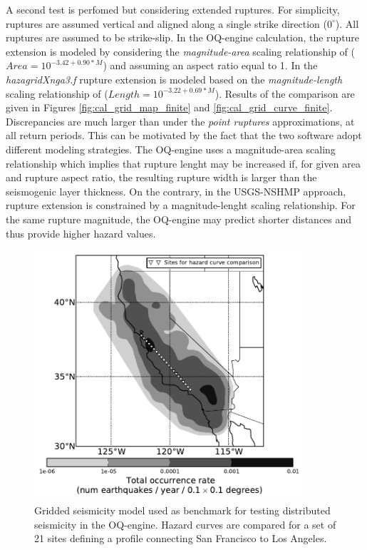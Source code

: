 A second test is perfomed but considering extended ruptures. For simplicity, ruptures are assumed vertical and aligned along a single strike direction ($0^{\circ}$). All ruptures are assumed to be strike-slip. In the OQ-engine calculation, the rupture extension is modeled by considering the \textit{magnitude-area} scaling relationship of \cite{wells1994} ($Area = 10^{-3.42 + 0.90 * M}$) and assuming an aspect ratio equal to 1. In the \textit{hazagridXnga3.f} rupture extension is modeled based on the \textit{magnitude-length} scaling relationship of \cite{wells1994} ($Length = 10^{-3.22+0.69 * M}$). Results of the comparison are given in Figures \ref{fig:cal_grid_map_finite} and \ref{fig:cal_grid_curve_finite}. Discrepancies are much larger than under the \textit{point ruptures} approximations, at all return periods. This can be motivated by the fact that
the two software adopt different modeling strategies. The OQ-engine uses a magnitude-area scaling relationship which implies that rupture lenght may be increased if, for given area and rupture aspect ratio, the resulting rupture width is larger than the seismogenic layer thickness. On the contrary, in the USGS-NSHMP approach, rupture extension is constrained by a magnitude-lenght scaling relationship. For the same rupture magnitude, the OQ-engine may predict shorter distances and thus provide higher hazard values.

\begin{figure}
\centering
\includegraphics[width=10cm]{./qareport/pictures/CAmapC_21.pdf}
\caption{Gridded seismicity model used as benchmark for testing distributed seismicity in the OQ-engine. Hazard curves are compared for a set of 21 sites defining a profile connecting San Francisco to Los Angeles.}
\label{fig:cal_grid}
\end{figure}


